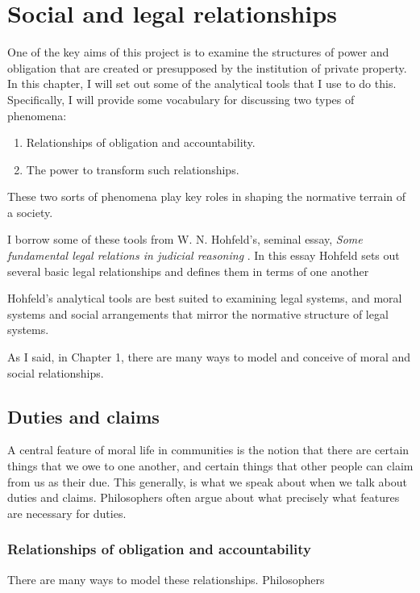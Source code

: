 \chapter{Social and legal relationships}\label{cha:soci-legal-relat}

One of the key aims of this project is to examine the structures of power and
obligation that are created or presupposed by the institution of private
property.
In this chapter, I will set out some of the analytical tools that I use to do
this.
Specifically, I will provide some vocabulary for discussing two types of phenomena:
\begin{enumerate}
	\item Relationships of obligation and accountability.
	\item The power to transform such relationships.
\end{enumerate}
These two sorts of phenomena play key roles in shaping the normative terrain of a society.

I borrow some of these tools from W. N. Hohfeld's, seminal essay, \emph{Some
	fundamental legal relations in judicial reasoning}
\citeyearpar{hohfeldfundamentallegal1913}.
In this essay Hohfeld sets out several basic legal relationships and defines
them in terms of one another \citep[pp.
	28--59]{hohfeldfundamentallegal1913}

Hohfeld's analytical tools are best suited to examining legal systems, and
moral systems and social arrangements that mirror the normative structure of
legal systems.

As I said, in Chapter 1, there are many ways to model and conceive of moral and
social relationships.

\section{Duties and claims}\label{sec:duties-claims}


A central feature of moral life in communities is the notion that there are
certain things that we owe to one another, and certain things that other people
can claim from us as their due.
This generally, is what we speak about when we talk about duties and claims.
Philosophers often argue about what precisely what features are necessary for
duties.

\subsection{Relationships of obligation and accountability}\label{sec:obl-acc}
There are many ways to model these relationships.
Philosophers


